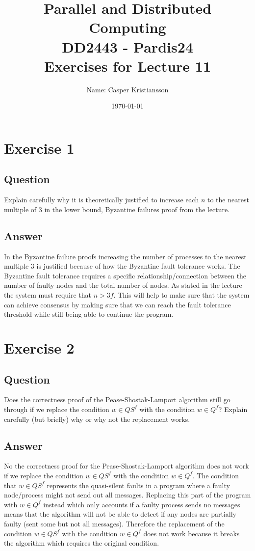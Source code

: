 \documentclass{article}
\title{\textbf{Parallel and Distributed Computing\\DD2443 - Pardis24\\Exercises for Lecture 11}}
\author{Name: Casper Kristiansson}
\date{\today}
\begin{document}
\setlength\parindent{0pt}
\setlength{\parskip}{\bigskipamount}

\maketitle

\section*{Exercise 1}
\subsection*{Question}
Explain carefully why it is theoretically justified to increase each $n$ to the nearest multiple of 3 in the lower bound, Byzantine failures proof from the lecture.

\subsection*{Answer}
In the Byzantine failure proofs increasing the number of processes to the nearest multiple 3 is justified because of how the Byzantine fault tolerance works. The Byzantine fault tolerance requires a specific relationship/connection between the number of faulty nodes and the total number of nodes. As stated in the lecture the system must require that \(n > 3f\). This will help to make sure that the system can achieve consensus by making sure that we can reach the fault tolerance threshold while still being able to continue the program.


\section*{Exercise 2}
\subsection*{Question}
Does the correctness proof of the Pease-Shostak-Lamport algorithm still go through if we replace the condition $w \in QS^f$ with the condition $w \in Q^f$? Explain carefully (but briefly) why or why not the replacement works.

\subsection*{Answer}
No the correctness proof for the Pease-Shostak-Lamport algorithm does not work if we replace the condition $w \in QS^f$ with the condition $w \in Q^f$. The condition that $w \in QS^f$ represents the quasi-silent faults in a program where a faulty node/process might not send out all messages. Replacing this part of the program with $w \in Q^f$ instead which only accounts if a faulty process sends no messages means that the algorithm will not be able to detect if any nodes are partially faulty (sent some but not all messages). Therefore the replacement of the condition $w \in QS^f$ with the condition $w \in Q^f$ does not work because it breaks the algorithm which requires the original condition.
\end{document}
